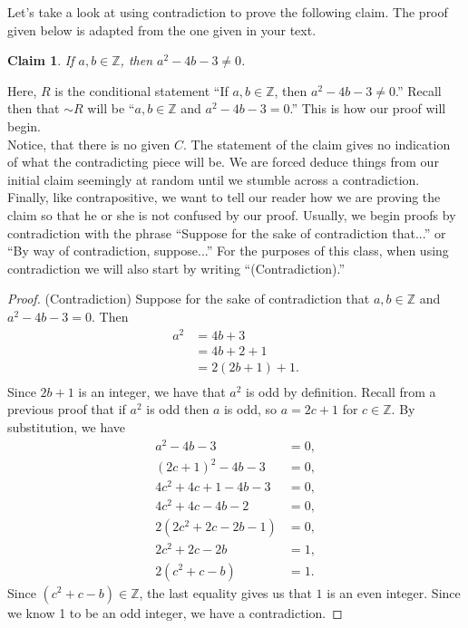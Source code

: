 \documentclass[12 pt]{article}
\newcommand{\Z}{\mathbb{Z}}
\theoremstyle{definition}
\theoremstyle{plain}
\theoremstyle{mytheorem}
\theoremstyle{myexample}
\newtheorem{claim}{Claim}
\theoremstyle{mydefinition}
\begin{document}
\vspace{.5in}

\noindent  Let's take a look at using contradiction to prove the following claim.  The proof given below is adapted from the one given in your text.

\begin{claim} If $a,b \in \Z$, then $a^2-4b-3 \neq 0$.
\end{claim}

Here, $R$ is the conditional statement ``If $a,b \in \Z$, then $a^2-4b-3 \neq 0$.''  Recall then that $\sim R$ will be ``$a, b \in \Z$ and $a^2-4b-3=0$.''  This is how our proof will begin.\\

Notice, that there is no given $C$.  The statement of the claim gives no indication of what the contradicting piece will be.  We are forced deduce things from our initial claim seemingly at random until we stumble across a contradiction.\\

Finally, like contrapositive, we want to tell our reader how we are proving the claim so that he or she is not confused by our proof.  Usually, we begin proofs by contradiction with the phrase ``Suppose for the sake of contradiction that...'' or ``By way of contradiction, suppose...''  For the purposes of this class, when using contradiction we will also start by writing ``(Contradiction).''\\

\begin{proof}  (Contradiction) Suppose for the sake of contradiction that $a,b \in \Z$ and ${a^2-4b-3 = 0}$.  Then 
\begin{align*}
a^2 &= 4b+3\\
\ &=4b+2+1\\
\ &=2(2b+1)+1.\\
\end{align*}
  Since $2b+1$ is an integer, we have that $a^2$ is odd by definition.  Recall from a previous proof that if $a^2$ is odd then $a$ is odd, so $a=2c+1$ for $c \in \Z$.  By substitution, we have
	\begin{align*}
	a^2-4b-3 &= 0,\\
	(2c+1)^2-4b-3 &= 0, \\
	4c^2+4c+1 -4b-3 &= 0,\\
	4c^2+4c-4b-2 &= 0,\\
	2(2c^2+2c-2b-1) &=0, \\
	2c^2 +2c -2b &= 1, \\
	2(c^2+c-b) &= 1.
	\end{align*}
Since $(c^2+c-b) \in \Z$, the last equality gives us that $1$ is an even integer.  Since we know 1 to be an odd integer, we have a contradiction.
\end{proof}
\end{document}
